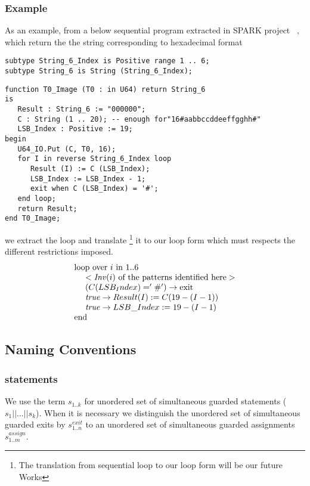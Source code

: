 \documentclass[a4paper,10pt]{article}
\newcommand{\idx}{\ensuremath{i}\xspace}
\newcommand{\KWloop}{\ensuremath{\mathrm{loop}~}}
\newcommand{\KWend}{\ensuremath{\mathrm{end}~}}
\newcommand{\KWover}{\ensuremath{\mathrm{over}~}}
\newcommand{\KWin}{\ensuremath{~\mathrm{in}~}}
\newcommand{\KWexit}{\ensuremath{\mathrm{exit}}}
\newcommand{\Inv}[1]{\ensuremath{\mathit{Inv}(#1)\xspace}}
\newcommand{\gstatement}[2]{\ensuremath{s^{\mathit{#1}}_{\mathit{#2}}\xspace}}
\begin{document}
\subsubsection*{Example}
As an example, from a below sequential program extracted in SPARK project ~\cite{sparkskein:url}, 
which return the the string corresponding to hexadecimal format
\begin{lstlisting}
subtype String_6_Index is Positive range 1 .. 6;
subtype String_6 is String (String_6_Index);
\end{lstlisting}

\begin{lstlisting}
function T0_Image (T0 : in U64) return String_6
is
   Result : String_6 := "000000";
   C : String (1 .. 20); -- enough for"16#aabbccddeeffgghh#"
   LSB_Index : Positive := 19;
begin
   U64_IO.Put (C, T0, 16);
   for I in reverse String_6_Index loop
      Result (I) := C (LSB_Index);
      LSB_Index := LSB_Index - 1;
      exit when C (LSB_Index) = '#';
   end loop;
   return Result;
end T0_Image;
\end{lstlisting}

we extract the loop and translate \footnote{The translation from sequential loop to our 
loop form will be our future Works} it to our loop form which must respects the different 
restrictions imposed.
$$\begin{array}{l}
  \KWloop \KWover i \KWin 1 .. 6 \\
  ~~~~ < \textrm{\Inv{\idx} of the patterns identified here} >\\
  ~~~~ (C (LSB_Index) = '\#') \rightarrow \KWexit\\
  ~~~~ \mathit{true} \rightarrow Result (I) := C (19-(I-1))\\
  ~~~~ \mathit{true} \rightarrow LSB\_Index := 19 - (I-1)\\
  \KWend
\end{array}$$

\subsection{Naming Conventions}
\label{sec:naming-conventions}

\subsubsection*{statements} 
We use the term \gstatement{}{1..k} for unordered set of simultaneous
guarded statements ($s_1|| ... ||s_k$). When it is necessary we distinguish 
the unordered set of simultaneous guarded exits by \gstatement{exit}{1..n} to
an unordered set of simultaneous guarded assignments \gstatement{assign}{1..m}.
\end{document}

